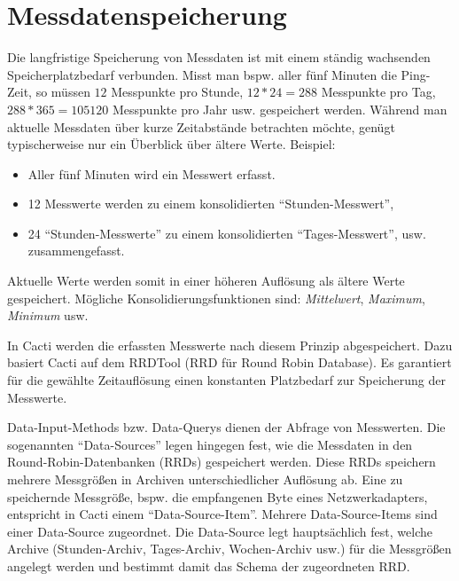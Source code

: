 \documentclass[12pt,ngerman,toc=listofnumbered,toc=bibliographynumbered,toc=index,headsepline=true]{scrbook}
\begin{document}
\section{Messdatenspeicherung}
Die langfristige Speicherung von Messdaten ist mit einem ständig wachsenden
Speicherplatzbedarf verbunden. Misst man bspw. aller fünf Minuten die Ping-Zeit,
so müssen $12$ Messpunkte pro Stunde, $12*24 = 288$ Messpunkte pro Tag, $288*365=
105120$ Messpunkte pro Jahr usw. gespeichert werden. Während man aktuelle
Messdaten über kurze Zeitabstände betrachten möchte, genügt typischerweise nur
ein Überblick über ältere Werte. Beispiel:
\begin{itemize}
  \item Aller fünf Minuten wird ein Messwert erfasst.
  \item 12 Messwerte werden zu einem konsolidierten
  \enquote{Stunden-Messwert},
  \item 24 \enquote{Stunden-Messwerte} zu einem konsolidierten
  \enquote{Tages-Messwert}, usw. zusammengefasst.
\end{itemize}

Aktuelle Werte werden somit in einer höheren Auflösung als ältere Werte
gespeichert. Mögliche Konsolidierungsfunktionen sind:
\textit{Mittelwert}, \textit{Maximum}, \textit{Minimum} usw.

In Cacti werden die erfassten Messwerte nach diesem Prinzip abgespeichert. Dazu
basiert Cacti auf dem RRDTool (RRD für Round Robin Database). Es garantiert für
die gewählte Zeitauflösung einen konstanten Platzbedarf zur Speicherung der
Messwerte.

Data-Input-Methods bzw. Data-Querys dienen der Abfrage von Messwerten. Die
sogenannten \enquote{Data-Sources} legen hingegen fest, wie die Messdaten in den
Round-Robin-Datenbanken (RRDs) gespeichert werden. Diese RRDs speichern mehrere
Messgrößen in Archiven unterschiedlicher Auflösung ab. Eine zu speichernde
Messgröße, bspw. die empfangenen Byte eines Netzwerkadapters, entspricht in
Cacti einem \enquote{Data-Source-Item}. Mehrere Data-Source-Items sind einer
Data-Source zugeordnet. Die Data-Source legt hauptsächlich fest, welche Archive
(Stunden-Archiv, Tages-Archiv, Wochen-Archiv usw.) für die Messgrößen angelegt
werden und bestimmt damit das Schema der zugeordneten RRD.
\end{document}
